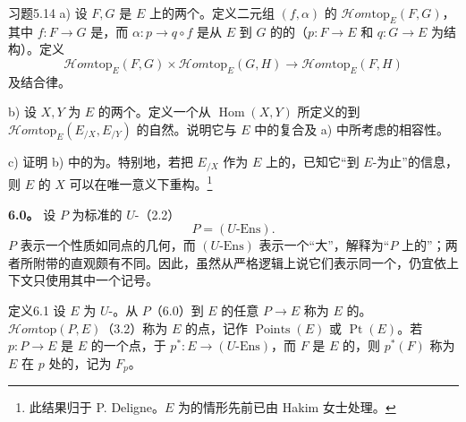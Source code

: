 \begin{SGAresult}{习题}{5.14}
 a) 设 $F,G$ 是 $E$ 上的两个。定义二元组 $(f,\alpha)$ 的 $\mathscr{H}om\mathrm{top}_E(F,G)$，其中 $f:F\to G$ 是，而 $\alpha:p\to q\circ f$ 是从 $E$ 到 $G$ 的的（$p:F\to E$ 和 $q:G\to E$ 为结构）。定义
\[\mathscr{H}om\mathrm{top}_E(F,G)\times\mathscr{H}om\mathrm{top}_E(G,H)\longrightarrow\mathscr{H}om\mathrm{top}_E(F,H)\]
及结合律。

 b) 设 $X,Y$ 为 $E$ 的两个。定义一个从 $\operatorname{Hom}(X,Y)$ 所定义的到 $\mathscr{H}om\mathrm{top}_E(E_{/X},E_{/Y})$ 的自然。说明它与 $E$ 中的复合及 a) 中所考虑的相容性。

 c) 证明 b) 中的为。特别地，若把 $E_{/X}$ 作为 $E$ 上的，已知它“到 $E$-为止”的信息，
则 $E$ 的 $X$ 可以在唯一意义下重构。\footnote{此结果归于 P. Deligne。$E$ 为的情形先前已由 Hakim 女士处理。}
\end{SGAresult}

\textbf{6.0。} 设 $P$ 为标准的 $U$-（2.2）
\[P=(U\text{-}\mathrm{Ens}).\]
 $P$ 表示一个性质如同点的几何，而 $(U\text{-}\mathrm{Ens})$ 表示一个“大”，解释为“$P$ 上的”；两者所附带的直观颇有不同。因此，虽然从严格逻辑上说它们表示同一个，仍宜依上下文只使用其中一个记号。

\begin{SGAresult}{定义}{6.1}
设 $E$ 为 $U$-。从 $P$（6.0）到 $E$ 的任意 $P\to E$ 称为 $E$ 的。 $\mathscr{H}om\mathrm{top}(P,E)$（3.2）称为 $E$ 的点，记作 $\operatorname{Points}(E)$ 或 $\operatorname{Pt}(E)$。若 $p:P\to E$ 是 $E$ 的一个点，于 $p^*:E\to(U\text{-}\mathrm{Ens})$，而 $F$ 是 $E$ 的，则 $p^*(F)$ 称为 $E$ 在 $p$ 处的，记为 $F_p$。
\end{SGAresult}

